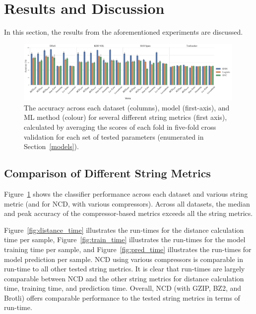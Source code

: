 \documentclass[preprint,12pt]{article}
\begin{document}
\section{Results and Discussion}
\label{results}

In this section, the results from the aforementioned experiments are discussed. 


\begin{figure}[p]
    \centering
    \includegraphics[width=0.99\textwidth]{images/accuracy_vs_metric.pdf}
    \caption{The accuracy across each dataset (columns), model (first-axis), and ML method (colour) for several different string metrics (first axis), calculated by averaging the scores of each fold in five-fold cross validation for each set of tested parameters (enumerated in Section~\ref{models}).}
    \label{fig:metric_acc}
\end{figure}



\subsection{Comparison of Different String Metrics}

Figure~\ref{fig:metric_acc} shows the classifier performance across each dataset and various string metric (and for NCD, with various compressors).
Across all datasets, the median and peak accuracy of the compressor-based metrics exceeds all the string metrics.

Figure~\ref{fig:distance_time} illustrates the run-times for the distance calculation time per sample, Figure~\ref{fig:train_time} illustrates the run-times for the model training time per sample, and Figure~\ref{fig:pred_time} illustrates the run-times for model prediction per sample.
NCD using various compressors is comparable in run-time to all other tested string metrics.
It is clear that run-times are largely comparable between NCD and the other string metrics for distance calculation time, training time, and prediction time.
Overall, NCD (with GZIP, BZ2, and Brotli) offers comparable performance to the tested string metrics in terms of run-time. 
\end{document}
